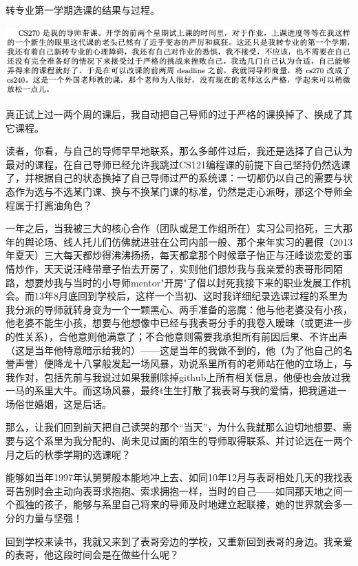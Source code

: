 \documentclass[9pt, b5paper]{article}
\begin{document}
转专业第一学期选课的结果与过程。

\begin{center}
\includegraphics[width=.9\linewidth]{./pic/backups_plans_20210421_141921.png}
\end{center}

真正试上过一两个周的课后，我自动把自己导师的过于严格的课换掉了、换成了其它课程。

读者，你看，与自己的导师早早地联系，那么多邮件过后，我还是选择了自己认为最对的课程，在自己导师已经允许我跳过CS121编程课的前提下自己坚持仍然选课了，并根据自己的状态换掉了自己导师过严的系统课：一切都仍以自己的需要与状态作为选与不选某门课、换与不换某门课的标准，仍然是走心派呀，那这个导师全程属于打酱油角色？

一年之后，当我被三大的核心合作（团队或是工作组所在）实习公司掐死，三大那年的舆论场、线人托儿们仿佛就进驻在公司内部一般、那个来年实习的暑假（2013年夏天）三大每天都炒得沸沸扬扬，每天都拿那个时候章子怡正与汪峰谈恋爱的事情炒作，天天说汪峰带章子怡去开房了，实则他们想炒我与我亲爱的表哥形同陌路，想要炒我与当时的小导师mentor"开房"了借以封死我接下来的职业发展工作机会。而13年8月底回到学校后，这样一个当初、这时我详细纪录选课过程的系里为我分派的导师就转身变为一个一颗黑心、两手准备的恶魔：他与他老婆没有小孩，他老婆不能生小孩，想要与他想像中已经与我表哥分手的我卷入暧昧（或更进一步的性关系），合他意则他满意了；不合他意则需要我承担所有前因后果、不许出声（这是当年他特意暗示给我的）——这是当年的我做不到的，他（为了他自己的名誉声誉）便降龙十八掌般发起一场风暴，劝说系里所有的老师站在他的立场上，与我作对，包括先前与我说过如果我删除掉github上所有相关信息，他便也会放过我一马的系里大牛。而这场风暴，最终t生生打散了我表哥与我的爱情，把我逼进一场俗世婚姻，这是后话。 

那么，让我们回到前天把自己读哭的那个“当天”，为什么我就那么迫切地想要、需要与这个系里为我分配的、尚未见过面的陌生的导师取得联系、并讨论远在一两个月之后的秋季学期的选课呢？

能够如当年1997年认舅舅般本能地冲上去、如同10年12月与表哥相处几天的我找表哥告别时会主动向表哥求抱抱、索求拥抱一样，当时的自己——如同那天地之间一个孤独的孩子，能够与系里自己将来的导师及时地建立起联接，她的世界就会多一分的力量与坚强！

回到学校来读书，我就又来到了表哥旁边的学校，又重新回到表哥的身边。我亲爱的表哥，他这段时间会是在做些什么呢？
\end{document}
